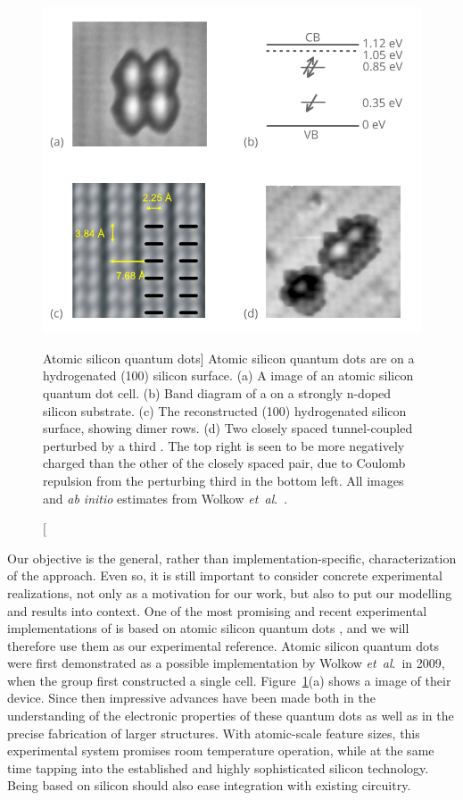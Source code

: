 \begin{figure}
  \center
  \includegraphics{silicon}
  \caption
[Atomic silicon quantum dots]
{
Atomic silicon quantum dots are \emph{} on a hydrogenated (100)
silicon surface. (a) A  image of an atomic silicon quantum dot
 cell. (b) Band diagram of a  on a strongly n-doped silicon
substrate. (c) The reconstructed (100) hydrogenated silicon surface, showing
dimer rows. (d) Two closely spaced tunnel-coupled  perturbed by a
third . The top right  is seen to be more negatively charged
than the other  of the closely spaced pair, due to Coulomb repulsion
from the perturbing third  in the bottom left. All  images
and \emph{ab initio} estimates from Wolkow \emph{et~al}.\
\cite{wolkow2013silicon, pitters2011tunnel}.
}
  \label{fig:silicon}
\end{figure}

Our objective is the general, rather than implementation-specific,
characterization of the \cgls{QCA} approach. Even so, it is still important to
consider concrete experimental realizations, not only as a motivation for our
work, but also to put our modelling and results into context. One of the most
promising and recent experimental implementations of \cgls{QCA} is based on
atomic silicon quantum dots \cite{haider2009controlled, pitters2011tunnel,
wolkow2013silicon}, and we will therefore use them as our experimental
reference. Atomic silicon quantum dots were first demonstrated as a possible
 implementation by Wolkow \emph{et~al}.\ in 2009, when the group first
constructed a single \cgls{QCA} cell. Figure~\ref{fig:silicon}(a) shows a
\cgls{STM} image of their device. Since then impressive advances have been made
both in the understanding of the electronic properties of these quantum dots as
well as in the precise fabrication of larger \cgls{QCA} structures. With
atomic-scale feature sizes, this experimental system promises room temperature
operation, while at the same time tapping into the established and highly
sophisticated silicon technology. Being based on silicon should also ease
integration with existing \cgls{CMOS} circuitry.

